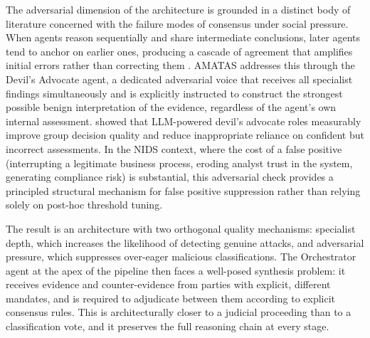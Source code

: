 The adversarial dimension of the architecture is grounded in a distinct body of literature concerned with the failure modes of consensus under social pressure. When agents reason sequentially and share intermediate conclusions, later agents tend to anchor on earlier ones, producing a cascade of agreement that amplifies initial errors rather than correcting them \autocite{Sunstein2002}. AMATAS addresses this through the Devil's Advocate agent, a dedicated adversarial voice that receives all specialist findings simultaneously and is explicitly instructed to construct the strongest possible benign interpretation of the evidence, regardless of the agent's own internal assessment. \textcite{Yin2024} showed that LLM-powered devil's advocate roles measurably improve group decision quality and reduce inappropriate reliance on confident but incorrect assessments. In the NIDS context, where the cost of a false positive (interrupting a legitimate business process, eroding analyst trust in the system, generating compliance risk) is substantial, this adversarial check provides a principled structural mechanism for false positive suppression rather than relying solely on post-hoc threshold tuning.

The result is an architecture with two orthogonal quality mechanisms: specialist depth, which increases the likelihood of detecting genuine attacks, and adversarial pressure, which suppresses over-eager malicious classifications. The Orchestrator agent at the apex of the pipeline then faces a well-posed synthesis problem: it receives evidence and counter-evidence from parties with explicit, different mandates, and is required to adjudicate between them according to explicit consensus rules. This is architecturally closer to a judicial proceeding than to a classification vote, and it preserves the full reasoning chain at every stage.

